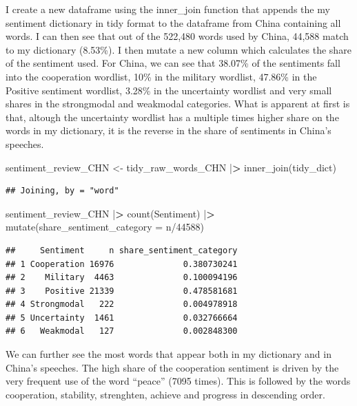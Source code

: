 \documentclass[
]{article}
\newenvironment{Shaded}{\begin{snugshade}}{\end{snugshade}}
\newcommand{\AttributeTok}[1]{\textcolor[rgb]{0.77,0.63,0.00}{#1}}
\newcommand{\DecValTok}[1]{\textcolor[rgb]{0.00,0.00,0.81}{#1}}
\newcommand{\ErrorTok}[1]{\textcolor[rgb]{0.64,0.00,0.00}{\textbf{#1}}}
\newcommand{\FunctionTok}[1]{\textcolor[rgb]{0.00,0.00,0.00}{#1}}
\newcommand{\NormalTok}[1]{#1}
\newcommand{\OtherTok}[1]{\textcolor[rgb]{0.56,0.35,0.01}{#1}}
\newcommand{\SpecialCharTok}[1]{\textcolor[rgb]{0.00,0.00,0.00}{#1}}
\begin{document}
I create a new dataframe using the inner\_join function that appends the
my sentiment dictionary in tidy format to the dataframe from China
containing all words. I can then see that out of the 522,480 words used
by China, 44,588 match to my dictionary (8.53\%). I then mutate a new
column which calculates the share of the sentiment used. For China, we
can see that 38.07\% of the sentiments fall into the cooperation
wordlist, 10\% in the military wordlist, 47.86\% in the Positive
sentiment wordlist, 3.28\% in the uncertainty wordlist and very small
shares in the strongmodal and weakmodal categories. What is apparent at
first is that, altough the uncertainty wordlist has a multiple times
higher share on the words in my dictionary, it is the reverse in the
share of sentiments in China's speeches.

\begin{Shaded}
\begin{Highlighting}[]
\NormalTok{sentiment\_review\_CHN }\OtherTok{\textless{}{-}}\NormalTok{ tidy\_raw\_words\_CHN }\SpecialCharTok{|}\ErrorTok{\textgreater{}} 
    \FunctionTok{inner\_join}\NormalTok{(tidy\_dict)}
\end{Highlighting}
\end{Shaded}

\begin{verbatim}
## Joining, by = "word"
\end{verbatim}

\begin{Shaded}
\begin{Highlighting}[]
\NormalTok{sentiment\_review\_CHN }\SpecialCharTok{|}\ErrorTok{\textgreater{}} 
    \FunctionTok{count}\NormalTok{(Sentiment) }\SpecialCharTok{|}\ErrorTok{\textgreater{}} 
    \FunctionTok{mutate}\NormalTok{(}\AttributeTok{share\_sentiment\_category =}\NormalTok{ n}\SpecialCharTok{/}\DecValTok{44588}\NormalTok{)}
\end{Highlighting}
\end{Shaded}

\begin{verbatim}
##     Sentiment     n share_sentiment_category
## 1 Cooperation 16976              0.380730241
## 2    Military  4463              0.100094196
## 3    Positive 21339              0.478581681
## 4 Strongmodal   222              0.004978918
## 5 Uncertainty  1461              0.032766664
## 6   Weakmodal   127              0.002848300
\end{verbatim}

We can further see the most words that appear both in my dictionary and
in China's speeches. The high share of the cooperation sentiment is
driven by the very frequent use of the word ``peace'' (7095 times). This
is followed by the words cooperation, stability, strenghten, achieve and
progress in descending order.
\end{document}
